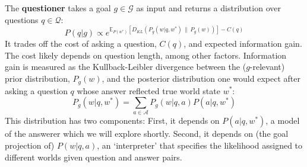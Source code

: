 \documentclass[12pt, floatsintext, jou]{apa6}
\begin{document}
\newcommand{\KL}[2]{\ensuremath{D_{KL}({#1}\, \| \, {#2})}}
\newcommand{\E}[2]{\ensuremath{\mathbb{E}_{#1}\left [#2 \right]}}

The \textbf{questioner} takes a goal $g \in \mathcal{G}$ as input and returns a distribution over questions $q \in \mathcal{Q}$:
%
$$ 
P(q|g) \propto e^{\E{P(w^*)}{\KL{P_g(w|q, w^*)}{P_g(w)}} - C(q)} 
$$
%
It trades off the cost of asking a question, $C(q)$, and expected information gain. The cost likely depends on question length, among other factors. Information gain is measured as the Kullback-Leibler divergence between the ($g$-relevant) prior distribution, $P_g(w)$, and the posterior distribution one would expect after asking a question $q$ whose answer reflected true world state $w^*$:
%
$$ P_g(w|q, w^*) = \sum_{a \in \mathcal{A}} P_g(w |q, a) P(a| q, w^*)$$
%
This distribution has two components: 
First, it depends on $P(a | q, w^*)$, a model of the answerer which we will explore shortly.
Second, it depends on (the goal projection of) 
$P(w | q, a)$, an `interpreter' that specifies the likelihood assigned to different worlds given question and answer pairs.
\end{document}
